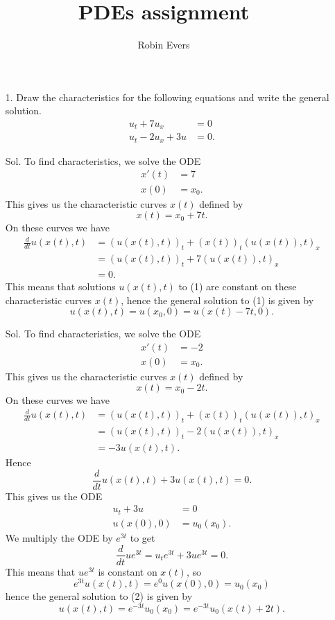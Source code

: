 \documentclass[]{report}
\title{PDEs assignment}
\author{Robin Evers}
\begin{document}
\maketitle
\begin{itemize}
	\item[1.] Draw the characteristics for the following equations and write the general solution.
	\begin{align}
		u_t + 7u_x &= 0\\
		u_t - 2u_x + 3u &= 0.
	\end{align}
	\item[Sol.] To find characteristics, we solve the ODE
	\begin{align*}
		x'(t)&=7\\
		x(0)&=x_0.
	\end{align*} 
	This gives us the characteristic curves $x(t)$ defined by 
	\[x(t)=x_0+7t.\]
	On these curves we have
	\begin{align*}
	\frac{d}{dt}u(x(t),t)&=(u(x(t),t))_t+(x(t))_t(u(x(t)),t)_x\\
	&=(u(x(t),t))_t+7(u(x(t)),t)_x\\
	&=0.
	\end{align*}
	This means that solutions $u(x(t),t)$ to (1) are constant on these characteristic curves $x(t)$, hence the general solution to (1) is given by
	\[u(x(t),t)=u(x_0,0)=u(x(t)-7t,0).\]
	\item[Sol.] To find characteristics, we solve the ODE
	\begin{align*}
	x'(t)&=-2\\
	x(0)&=x_0.
	\end{align*} 
	This gives us the characteristic curves $x(t)$ defined by 
	\[x(t)=x_0-2t.\]
	On these curves we have
	\begin{align*}
	\frac{d}{dt}u(x(t),t)&=(u(x(t),t))_t+(x(t))_t(u(x(t)),t)_x\\
	&=(u(x(t),t))_t-2(u(x(t)),t)_x\\
	&=-3u(x(t),t).
	\end{align*}
	Hence
	\[\frac{d}{dt}u(x(t),t)+3u(x(t),t)=0.\]
	This gives us the ODE
	\begin{align*}
		u_t+3u&=0\\
		u(x(0),0)&=u_0(x_0).
	\end{align*} 
	We multiply the ODE by $e^{3t}$ to get
	\[\frac{d}{dt}ue^{3t}=u_te^{3t}+3ue^{3t}=0.\]
	This means that $ue^{3t}$ is constant on $x(t)$, so
	\[e^{3t}u(x(t),t)=e^0u(x(0),0)=u_0(x_0)\]
	hence the general solution to (2) is given by
	\[u(x(t),t)=e^{-3t}u_0(x_0)=e^{-3t}u_0(x(t)+2t).\]

\end{itemize}
\end{document}
